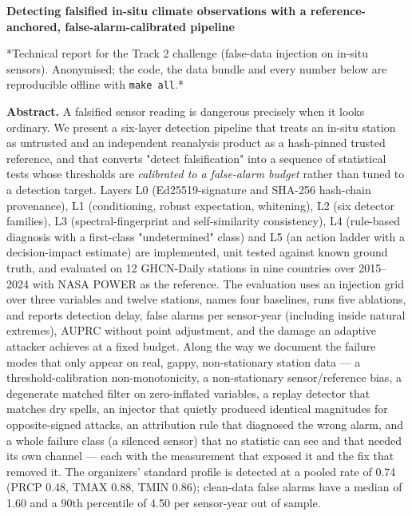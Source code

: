 \documentclass[10pt,a4paper]{article}
\begin{document}
\begin{center}
{\Large\bfseries Detecting falsified in-\allowbreak{}situ climate observations with a reference-\allowbreak{}anchored, false-\allowbreak{}alarm-\allowbreak{}calibrated pipeline\par}
\vspace{3pt}

\end{center}
\vspace{-2pt}
*Technical report for the Track 2 challenge (false-\allowbreak{}data injection on in-\allowbreak{}situ sensors). Anonymised; the code, the data bundle and every number below are reproducible offline with \texttt{make all}.*

\textbf{Abstract.} A falsified sensor reading is dangerous precisely when it looks ordinary. We present a six-\allowbreak{}layer detection pipeline that treats an in-\allowbreak{}situ station as untrusted and an independent reanalysis product as a hash-\allowbreak{}pinned trusted reference, and that converts "detect falsification" into a sequence of statistical tests whose thresholds are \emph{calibrated to a false-\allowbreak{}alarm budget} rather than tuned to a detection target. Layers L0 (Ed25519-\allowbreak{}signature and SHA-\allowbreak{}256 hash-\allowbreak{}chain provenance), L1 (conditioning, robust expectation, whitening), L2 (six detector families), L3 (spectral-\allowbreak{}fingerprint and self-\allowbreak{}similarity consistency), L4 (rule-\allowbreak{}based diagnosis with a first-\allowbreak{}class "undetermined" class) and L5 (an action ladder with a decision-\allowbreak{}impact estimate) are implemented, unit tested against known ground truth, and evaluated on 12 GHCN-\allowbreak{}Daily stations in nine countries over 2015–2024 with NASA POWER as the reference. The evaluation uses an injection grid over three variables and twelve stations, names four baselines, runs five ablations, and reports detection delay, false alarms per sensor-\allowbreak{}year (including inside natural extremes), AUPRC without point adjustment, and the damage an adaptive attacker achieves at a fixed budget. Along the way we document the failure modes that only appear on real, gappy, non-\allowbreak{}stationary station data — a threshold-\allowbreak{}calibration non-\allowbreak{}monotonicity, a non-\allowbreak{}stationary sensor/\allowbreak{}reference bias, a degenerate matched filter on zero-\allowbreak{}inflated variables, a replay detector that matches dry spells, an injector that quietly produced identical magnitudes for opposite-\allowbreak{}signed attacks, an attribution rule that diagnosed the wrong alarm, and a whole failure class (a silenced sensor) that no statistic can see and that needed its own channel — each with the measurement that exposed it and the fix that removed it. The organizers' standard profile is detected at a pooled rate of 0.74 (PRCP 0.48, TMAX 0.88, TMIN 0.86); clean-\allowbreak{}data false alarms have a median of 1.60 and a 90th percentile of 4.50 per sensor-\allowbreak{}year out of sample.
\end{document}
